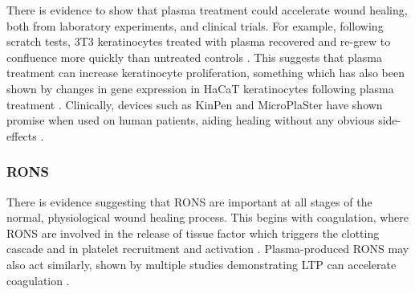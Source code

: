 \documentclass[11pt, oneside]{article}   	%
\newcommand{\toref}[1]{ \textcolor{blue}{\bf{REFERENCE #1}}}
\begin{document}
There is evidence to show that plasma treatment could accelerate wound healing, both from laboratory experiments, and clinical trials.
For example, following scratch tests, 3T3 keratinocytes treated with plasma recovered and re-grew to confluence more quickly than untreated controls \cite{Tipa2011plasma}.
This suggests that plasma treatment can increase keratinocyte proliferation, something which has also been shown by changes in gene expression in HaCaT keratinocytes following plasma treatment \cite{Barton2013nonthermal}.
Clinically, devices such as KinPen and MicroPlaSter have shown promise when used on human patients, aiding healing without any obvious side-effects \cite{Isbary2013cold, Isbary2012successful, Isbary2010a, Bekeschus2016the}.





\subsubsection{RONS}
There is evidence suggesting that RONS are important at all stages of the normal, physiological wound healing process.
This begins with coagulation, where RONS are involved in the release of tissue factor which triggers the clotting cascade and in platelet recruitment and activation \cite{Soneja2005role}.
Plasma-produced RONS may also act similarly, shown by multiple studies demonstrating LTP can accelerate coagulation \cite{Fridman2006blood, Chen2009blood}.

\end{document}
